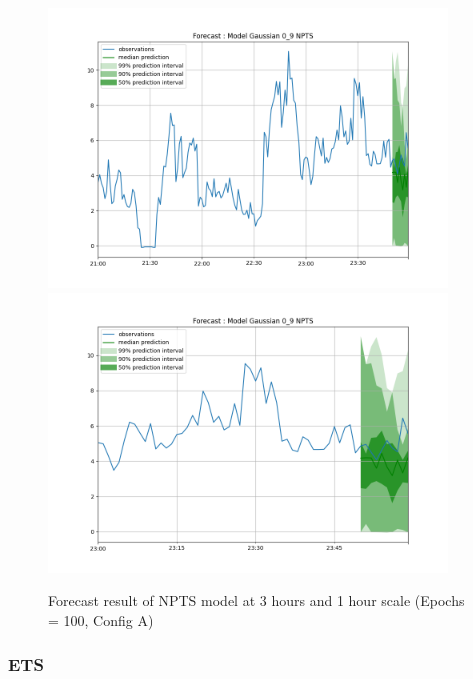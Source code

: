 \documentclass[a4paper, 12pt]{article}
\begin{document}
\begin{figure}[!h]
    \centering
    \includegraphics[width=400px]{plots/forecast/a/model/Gaussian/0_9/NPTS/180.png}
    \includegraphics[width=400px]{plots/forecast/a/model/Gaussian/0_9/NPTS/60.png}
    \caption{Forecast result of NPTS model at 3 hours and 1 hour scale (Epochs = 100, Config A)}
    \label{fig:npts}
\end{figure}

\subsubsection{ETS} \label{comp_ets}
\end{document}
